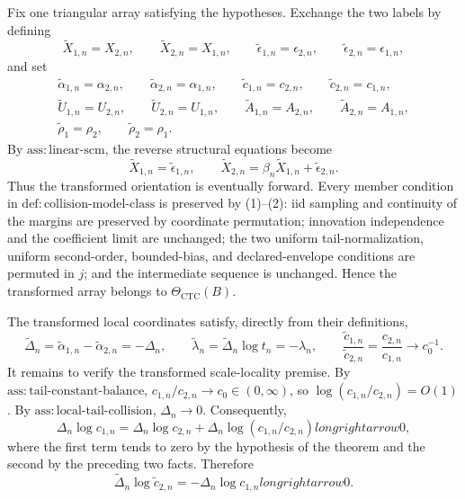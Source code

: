 Fix one triangular array satisfying the hypotheses. Exchange the two labels by defining
\[
\widetilde X_{1,n}=X_{2,n},\qquad
\widetilde X_{2,n}=X_{1,n},\qquad
\widetilde\epsilon_{1,n}=\epsilon_{2,n},\qquad
\widetilde\epsilon_{2,n}=\epsilon_{1,n},
\tag{1}
\]
and set
\[
\begin{gathered}
\widetilde\alpha_{1,n}=\alpha_{2,n},\qquad
\widetilde\alpha_{2,n}=\alpha_{1,n},\qquad
\widetilde c_{1,n}=c_{2,n},\qquad
\widetilde c_{2,n}=c_{1,n},\\
\widetilde U_{1,n}=U_{2,n},\qquad
\widetilde U_{2,n}=U_{1,n},\qquad
\widetilde A_{1,n}=A_{2,n},\qquad
\widetilde A_{2,n}=A_{1,n},\\
\widetilde\rho_1=\rho_2,\qquad
\widetilde\rho_2=\rho_1.
\end{gathered}
\tag{2}
\]
By \(\mathrm{ass{:}linear\text{-}scm}\), the reverse structural equations become
\[
\widetilde X_{1,n}=\widetilde\epsilon_{1,n},
\qquad
\widetilde X_{2,n}=\beta_n\widetilde X_{1,n}+\widetilde\epsilon_{2,n}.
\tag{3}
\]
Thus the transformed orientation is eventually forward. Every member condition in \(\mathrm{def{:}collision\text{-}model\text{-}class}\) is preserved by (1)--(2): iid sampling and continuity of the margins are preserved by coordinate permutation; innovation independence and the coefficient limit are unchanged; the two uniform tail-normalization, uniform second-order, bounded-bias, and declared-envelope conditions are permuted in \(j\); and the intermediate sequence is unchanged. Hence the transformed array belongs to \(\Theta_{\mathrm{CTC}}(B)\).

The transformed local coordinates satisfy, directly from their definitions,
\[
\widetilde\Delta_n
=\widetilde\alpha_{1,n}-\widetilde\alpha_{2,n}
=-\Delta_n,
\qquad
\widetilde\lambda_n
=\widetilde\Delta_n\log t_n
=-\lambda_n,
\qquad
\frac{\widetilde c_{1,n}}{\widetilde c_{2,n}}
=\frac{c_{2,n}}{c_{1,n}}\longrightarrow c_0^{-1}.
\tag{4}
\]
It remains to verify the transformed scale-locality premise. By \(\mathrm{ass{:}tail\text{-}constant\text{-}balance}\), \(c_{1,n}/c_{2,n}\to c_0\in(0,\infty)\), so \(\log(c_{1,n}/c_{2,n})=O(1)\). By \(\mathrm{ass{:}local\text{-}tail\text{-}collision}\), \(\Delta_n\to0\). Consequently,
\[
\Delta_n\log c_{1,n}
=\Delta_n\log c_{2,n}
+\Delta_n\log(c_{1,n}/c_{2,n})longrightarrow0,
\tag{5}
\]
where the first term tends to zero by the hypothesis of the theorem and the second by the preceding two facts. Therefore
\[
\widetilde\Delta_n\log\widetilde c_{2,n}
=-\Delta_n\log c_{1,n}longrightarrow0.
\tag{6}
\]

